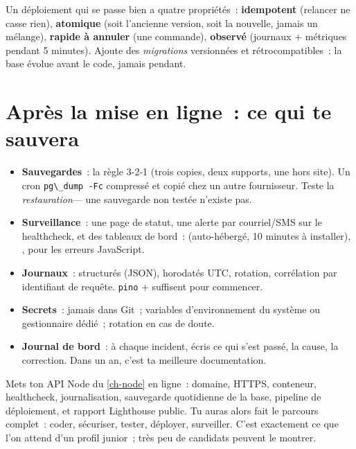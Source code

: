 Un d\'eploiement qui se passe bien a quatre propri\'et\'es~: \textbf{idempotent} (relancer ne casse rien),
\textbf{atomique} (soit l'ancienne version, soit la nouvelle, jamais un m\'elange),
\textbf{rapide \`a annuler} (une commande), \textbf{observ\'e} (journaux + m\'etriques pendant 5 minutes).
Ajoute des \emph{migrations} versionn\'ees et r\'etrocompatibles~: la base \'evolue avant le code, jamais
pendant.

\section{Apr\`es la mise en ligne~: ce qui te sauvera}

\begin{itemize}
  \item \textbf{Sauvegardes}~: la r\`egle 3-2-1 (trois copies, deux supports, une hors site).
        Un cron \verb|pg\_dump -Fc| compress\'e et copi\'e chez un autre fournisseur. Teste la
        \emph{restauration}--- une sauvegarde non test\'ee n'existe pas.
  \item \textbf{Surveillance}~: une page de statut, une alerte par courriel/SMS sur le healthcheck,
        et des tableaux de bord~: 
        (auto-h\'eberg\'e, 10 minutes \`a installer), ,
         pour les erreurs JavaScript.
  \item \textbf{Journaux}~: structur\'es (JSON), horodat\'es UTC, rotation, corr\'elation par identifiant
        de requ\^ete. \verb|pino| +  suffisent pour commencer.
  \item \textbf{Secrets}~: jamais dans Git~; variables d'environnement du syst\`eme ou
        gestionnaire d\'edi\'e~; rotation en cas de doute.
  \item \textbf{Journal de bord}~: \`a chaque incident, \'ecris ce qui s'est pass\'e, la cause, la
        correction. Dans un an, c'est ta meilleure documentation.
\end{itemize}

\begin{projet}
Mets ton API Node du \cref{ch-node} en ligne~: domaine, HTTPS, conteneur, healthcheck,
journalisation, sauvegarde quotidienne de la base, pipeline de d\'eploiement, et rapport
Lighthouse public. Tu auras alors fait le parcours complet~: coder, s\'ecuriser, tester, d\'eployer,
surveiller. C'est exactement ce que l'on attend d'un profil junior~; tr\`es peu de candidats
peuvent le montrer.
\end{projet}

